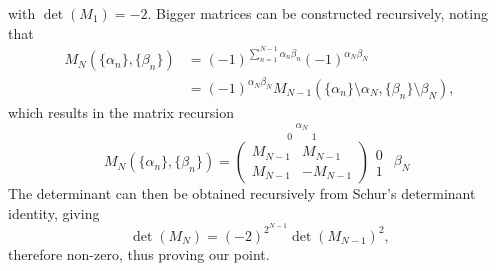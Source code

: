 \documentclass[a4paper]{article}
\begin{document}
with $\det(M_1) = -2$. Bigger matrices can be constructed recursively, noting that
\begin{align}
	M_N(\{\alpha_n\},\{\beta_n\}) &= (-1)^{\sum_{n=1}^{N-1} \alpha_n \beta_n} (-1)^{\alpha_N \beta_N}\\
	&= (-1)^{\alpha_N \beta_N} M_{N-1}(\{\alpha_n\} \setminus \alpha_N,\{\beta_n\} \setminus \beta_N),
\end{align}
which results in the matrix recursion
\begin{equation}
	M_N(\{\alpha_n\},\{\beta_n\}) =
	\overset{\alpha_N}{
	\overset{0~ ~ ~ ~ ~ ~ ~ ~ ~1}{
	\left(\begin{matrix}
		M_{N-1} & M_{N-1} \\
		M_{N-1} & -M_{N-1}
	\end{matrix}\right)
	}}
	\begin{matrix}
		 0 \\
		 1
	\end{matrix}
	\begin{matrix}
		  \\
		 \beta_N\\
		 \left. \right.
	\end{matrix}
\end{equation}
The determinant can then be obtained recursively from Schur's determinant identity, giving
\begin{equation}
	\det(M_N) = (-2)^{2^{N-1}} \det(M_{N-1})^2,
\end{equation}
therefore non-zero, thus proving our point.
\end{document}
